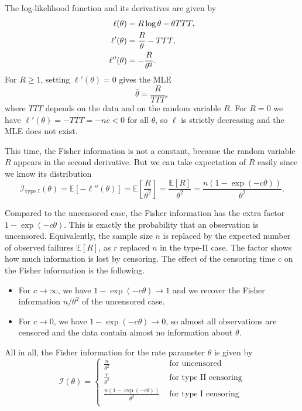 The log-likelihood function and its derivatives are given by
\begin{align}
	\ell(\theta) &= R \log \theta - \theta TTT, \label{log likelihood type I censored} \\
	\ell'(\theta) &= \frac{R}{\theta} - TTT, \notag \\
	\ell''(\theta) &= - \frac{R}{\theta^2}. \notag
\end{align}
For $R \geq 1$, setting $\ell'(\theta) = 0$ gives the MLE
\begin{equation} \label{MLE for type I}
	\hat\theta = \frac{R}{TTT},
\end{equation}
where $TTT$ depends on the data and on the random variable $R$.
For $R = 0$ we have $\ell'(\theta) = -TTT = -nc < 0$ for all $\theta$, so $\ell$ is strictly decreasing and the MLE does not exist.

This time, the Fisher information is not a constant, because the random variable $R$ appears in the second derivative. But we can take expectation of $R$ easily since we know its distribution
\[
\mathcal{I}_{\text{type I}}(\theta) 
= 
\mathbb{E} \left[ - \ell''(\theta) \right]
=
\mathbb{E} \left[ \frac{R}{\theta^2} \right]
=
\frac{\mathbb{E}[R]}{\theta^2} 
=
\frac{n \left( 1 - \exp(-c \theta) \right)}{\theta^2}.
\]

Compared to the uncensored case, the Fisher information has the extra factor $1 - \exp(-c\theta)$.
This is exactly the probability that an observation is uncensored.
Equivalently, the sample size $n$ is replaced by the expected number of observed failures $\mathbb{E}[R]$, as $r$ replaced $n$ in the type-II case.
The factor shows how much information is lost by censoring. The effect of the censoring time $c$ on the Fisher information is the following.

\begin{itemize}
	\item For $c \to \infty$, we have $1 - \exp(-c\theta) \to 1$ and we recover the Fisher information $n/\theta^2$ of the uncensored case.
	\item For $c \to 0$, we have $1 - \exp(-c\theta) \to 0$, so almost all observations are censored and the data contain almost no information about $\theta$.
\end{itemize}

All in all, the Fisher information for the rate parameter $\theta$ is given by 
\begin{equation*}
	\mathcal I (\theta) = 
	\begin{cases}
		\frac{n}{\theta^2} &\text{ for uncensored} \\
		\frac{r}{\theta^2} &\text{ for type II censoring} \\
		\frac{n(1 - \exp(- c \theta))}{\theta^2} &\text{ for type I censoring} \\
	\end{cases}
\end{equation*}

